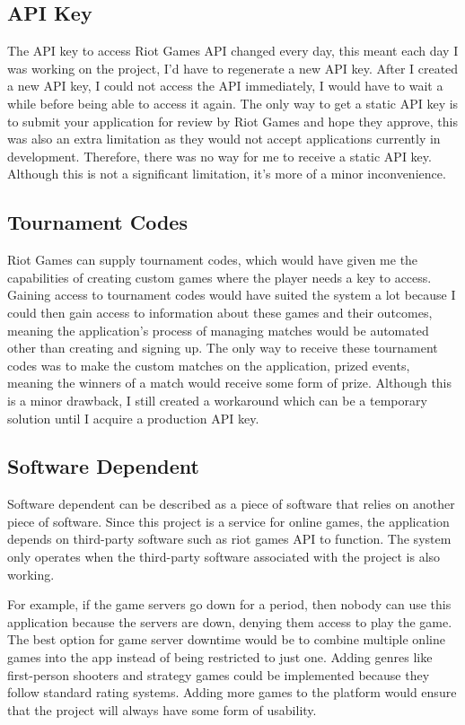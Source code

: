 \subsection{API Key}
The API key to access Riot Games API changed every day, this meant each day I was working on the project, I'd have to regenerate a new API key. After I created a new API key, I could not access the API immediately, I would have to wait a while before being able to access it again. The only way to get a static API key is to submit your application for review by Riot Games and hope they approve, this was also an extra limitation as they would not accept applications currently in development. Therefore, there was no way for me to receive a static API key. Although this is not a significant limitation, it's more of a minor inconvenience.
\subsection{Tournament Codes}
Riot Games can supply tournament codes, which would have given me the capabilities of creating custom games where the player needs a key to access. Gaining access to tournament codes would have suited the system a lot because I could then gain access to information about these games and their outcomes, meaning the application's process of managing matches would be automated other than creating and signing up. The only way to receive these tournament codes was to make the custom matches on the application, prized events, meaning the winners of a match would receive some form of prize. Although this is a minor drawback, I still created a workaround which can be a temporary solution until I acquire a production API key.
\subsection{Software Dependent}
Software dependent can be described as a piece of software that relies on another piece of software\cite{huang2007assessment}. Since this project is a service for online games, the application depends on third-party software such as riot games API to function. The system only operates when the third-party software associated with the project is also working. 

For example, if the game servers go down for a period, then nobody can use this application because the servers are down, denying them access to play the game. The best option for game server downtime would be to combine multiple online games into the app instead of being restricted to just one. Adding genres like first-person shooters and strategy games could be implemented because they follow standard rating systems. Adding more games to the platform would ensure that the project will always have some form of usability.\hfill \break

